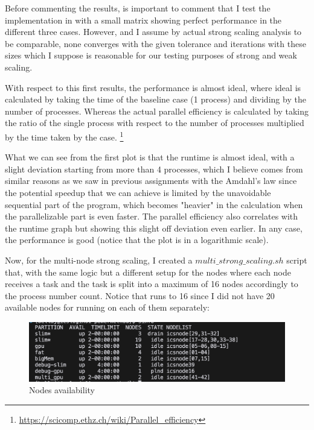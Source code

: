 \documentclass[unicode,11pt,a4paper,oneside,numbers=endperiod,openany]{scrartcl}
\begin{document}
Before commenting the results, is important to comment that I test the implementation in with a small matrix showing perfect performance in the different three cases.
However, and I assume by actual strong scaling analysis to be comparable, none converges with the given tolerance and iterations with these sizes which I suppose is reasonable for our 
testing purposes of strong and weak scaling. 

With respect to this first results, the performance is almost ideal, where ideal is calculated by taking the time of the baseline case (1 process) and dividing by the number of processes.
Whereas the actual parallel efficiency is calculated by taking the ratio of the single process with respect to the number of processes multiplied by the time taken by the case.  \footnote{\url{https://scicomp.ethz.ch/wiki/Parallel_efficiency}}

What we can see from the first plot is that the runtime is almost ideal, with a slight deviation starting from more than 4 processes, which I believe comes from similar reasons as we saw in previous assignments
with the Amdahl's law since the potential speedup that we can achieve is limited by the unavoidable sequential part of the program, which becomes "heavier" in the calculation when the parallelizable part is even faster. 
The parallel efficiency also correlates with the runtime graph but showing this slight off deviation even earlier. In any case, the performance is good (notice that the plot is in a logarithmic scale).

Now, for the multi-node strong scaling, I created a $multi\_strong\_scaling.sh$ script that, with the same logic but a different setup for the nodes where each node receives a task and the task is split into a maximum of 16 nodes 
accordingly to the process number count. Notice that runs to 16 since I did not have 20 available nodes for running on each of them separately: 

\begin{figure}[H]
    \centering
    \includegraphics[width=\textwidth]{./img/exe4/nodes.png}
    \caption{Nodes availability}
  \end{figure}
\end{document}
